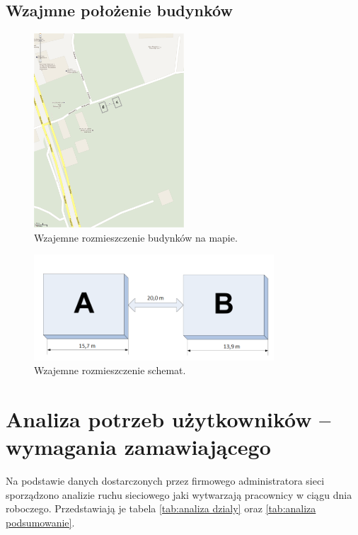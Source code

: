 \documentclass{report}
\begin{document}
\section{Wzajmne położenie budynków}
\begin{figure}[H]
  \centering
      \includegraphics[width=0.5\textwidth]{./obrazki/rzut_terenowy.png}
    \caption{Wzajemne rozmieszczenie budynków na mapie.}
\end{figure}

\begin{figure}[H]
  \centering
      \includegraphics[width=0.8\textwidth]{./obrazki/rozmieszczenie_budynkow.jpeg}
    \caption{Wzajemne rozmieszczenie schemat.}
\end{figure}



\chapter{Analiza potrzeb użytkowników – wymagania zamawiającego}
Na podstawie danych dostarczonych przez firmowego administratora sieci sporządzono analizie ruchu sieciowego jaki wytwarzają
pracownicy w ciągu dnia roboczego. Przedstawiają je tabela 
\ref{tab:analiza dzialy} oraz \ref{tab:analiza podsumowanie}.
\end{document}
